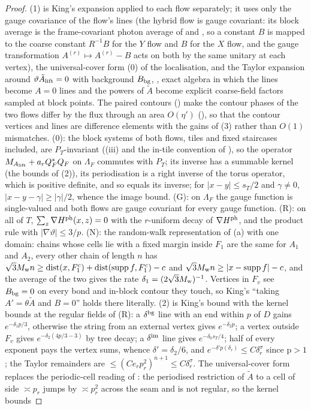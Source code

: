 \begin{proof}
(1) is King's expansion \cite[(3.43)--(3.55)]{K1} applied to each flow separately; it uses only the gauge covariance of the flow's lines (the hybrid flow is gauge covariant: its block average is the frame-covariant photon average of  and , so a constant $B$ is mapped to the coarse constant $R^{-1}B$ for the $Y$ flow and $B$ for the $X$ flow, and the gauge transformation $A^{(r)}\mapsto A^{(r)}-B$ acts on both by the same unitary at each vertex), the universal-cover form (0) of the localisation, and the Taylor expansion around $\vartheta\tilde A_{\rm lift}=0$ with background $B_{\rm bg}$, \cite[(3.47)--(3.54)]{K1}, exact algebra in which the lines become $A=0$ lines and the powers of $\tilde A$ become explicit coarse-field factors sampled at block points. The paired contours () make the contour phases of the two flows differ by the flux through an area $O(\eta')$ (), so that the contour vertices and lines are difference elements with the gains of (3) rather than $O(1)$ mismatches. (0): the block systems of both flows, tiles and fixed staircases included, are $P_T$-invariant ((iii) and the in-tile convention of ), so the operator $M_{A_{\rm lift}}+a_rQ_F^*Q_F$ on $\Lambda_F$ commutes with $P_T$; its inverse has a summable kernel (the bounds of (2)), its periodisation is a right inverse of the torus operator, which is positive definite, and so equals its inverse; for $|x-y|\le s_T/2$ and $\gamma\ne0$, $|x-y-\gamma|\ge|\gamma|/2$, whence the image bound. (G): on $\Lambda_F$ the gauge function is single-valued and both flows are gauge covariant for every gauge function. (R): \cite[(3.2)]{K1} on all of $T$, $\sum_z\nabla H^{\rm ph}(x,z)=0$ with the $r$-uniform decay of $\nabla H^{\rm ph}$, and the product rule with $|\nabla\vartheta|\le3/p$. (N): the random-walk representation of (a) with one domain: chains whose cells lie with a fixed margin inside $F_1$ are the same for $A_1$ and $A_2$, every other chain of length $n$ has $\sqrt3M_{\rm w}n\ge\operatorname{dist}(x,F_1^c)+\operatorname{dist}(\operatorname{supp} f,F_1^c)-c$ and $\sqrt3M_{\rm w}n\ge|x-\operatorname{supp} f|-c$, and the average of the two gives the rate $\delta_1=(2\sqrt3M_{\rm w})^{-1}$. Vertices in $F_v$ see $B_{\rm bg}=0$ on every bond and in-block contour they touch, so King's ``taking $A'=\theta\tilde A$ and $B=0$'' \cite[p.~662]{K1} holds there literally. (2) is King's bound \cite[p.~665]{K1} with the kernel bounds at the regular fields of (R): a $\delta^{\rm bg}$ line with an end within $p$ of $D$ gains $e^{-\delta_1p/3}$, otherwise the string from an external vertex gives $e^{-\delta_2p}$; a vertex outside $F_v$ gives $e^{-\delta_2(4p/3-3)}$ by tree decay; a $\delta^{\rm im}$ line gives $e^{-\delta_0s_T/4}$; half of every exponent pays the vertex sums, whence $\delta'=\delta_2/6$, and $e^{-\delta'p(\delta_r)}\le C\delta_r^\sigma$ since $\mathrm p>1$; the Taylor remainders are $\le(Ce_rp_r^2)^{\bar n+1}\le C\delta_r^\sigma$. The universal-cover form replaces the periodic-cell reading of \cite[p.~337]{K2}: the periodised restriction of $\tilde A$ to a cell of side $\asymp p_r$ jumps by $\asymp p_r^2$ across the seam and is not regular, so the kernel bounds 
\end{proof}
